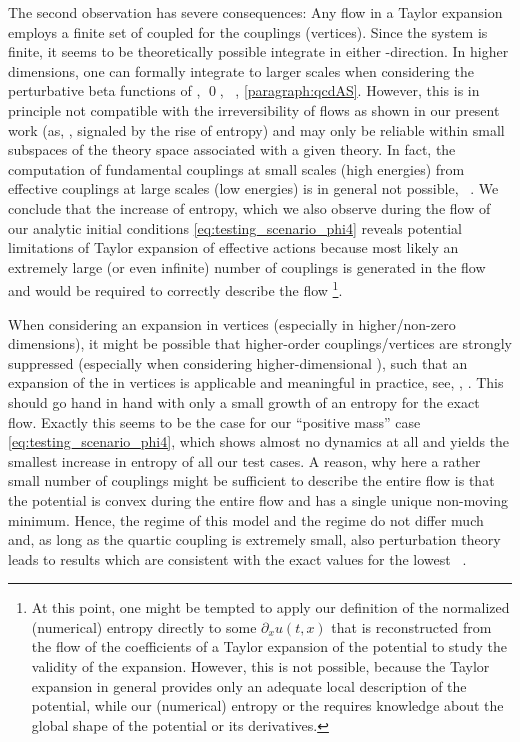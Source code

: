 The second observation has severe consequences: Any \frg{} flow in a \frg{} Taylor expansion employs a finite set of coupled \odes{} for the couplings (vertices).
Since the system is finite, it seems to be theoretically possible integrate in either \rgtime{}-direction. 
In higher dimensions, one can formally integrate to larger scales when considering the perturbative beta functions of \qcd{}, \qed{}, \etc{}~\cite{Politzer:1973fx,Gross:1973id,Gross:1973ju,Gross:1974cs}, \cf{} \cref{paragraph:qcdAS}.
However, this is in principle not compatible with the irreversibility of \grg{} flows as shown in our present work (as, \eg{}, signaled by the rise of entropy)  and may only be reliable within small subspaces of the theory space associated with a given theory.
In fact, the computation of fundamental couplings at small scales (high energies) from effective couplings at large scales (low energies) is in general not possible, \cf{}\ . We conclude that the increase of entropy, which we also observe during the \frg{} flow of our analytic initial conditions \eqref{eq:testing_scenario_phi4} reveals potential limitations of Taylor expansion of effective actions because most likely an extremely large (or even infinite) number of couplings is generated in the \frg{} flow and would be required to correctly describe the \frg{} flow 
\footnote{%
	At this point, one might be tempted to apply our definition of the normalized (numerical) entropy directly to some $\partial_x u ( t, x )$ that is reconstructed from the flow of the coefficients of a Taylor expansion of the potential to study the validity of the expansion.
	However, this is not possible, because the \frg{} Taylor expansion in general provides only an adequate local description of the potential, while our (numerical) entropy or the \tv{} requires knowledge about the global shape of the potential or its derivatives.
}.%

When considering an expansion in vertices (especially in higher/non-zero dimensions), it might be possible that higher-order couplings/vertices are strongly suppressed (especially when considering higher-dimensional \qfts{}), 
such that an expansion of the \frgEquation{} in vertices is applicable and meaningful in practice, see, \eg{}, .
This should go hand in hand with only a small growth of an entropy for the exact \frg{} flow.
Exactly this seems to be the case for our ``positive mass'' case \eqref{eq:testing_scenario_phi4}, which shows almost no dynamics at all and yields the smallest increase in entropy of all our test cases. 
A reason, why here a rather small number of couplings might be sufficient to describe the entire \frg{} flow is that the potential is convex during the entire flow and has a single unique non-moving minimum.
Hence, the \uv{} regime of this model and the \ir{} regime do not differ much and, as long as the quartic coupling is extremely small, also perturbation theory~\cite{Strocchi:2013awa} leads to results which are consistent with the exact values for the lowest \ipi{} \nptFunctions{}~\cite{Keitel:2011pn}.

